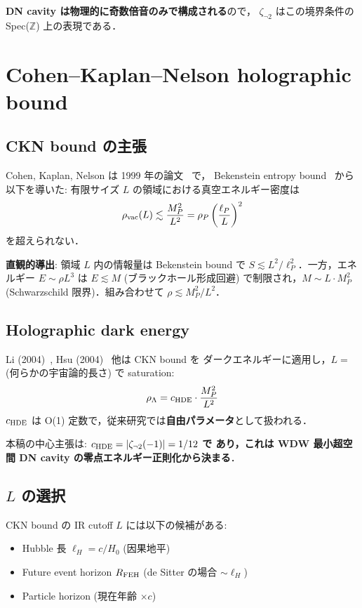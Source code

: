 \documentclass[11pt,a4paper]{article}
\begin{document}
\textbf{DN cavity は物理的に奇数倍音のみで構成される}ので，
$\zeta_{\neg 2}$ はこの境界条件の Spec($\mathbb{Z}$) 上の表現である．

\section{Cohen--Kaplan--Nelson holographic bound}

\subsection{CKN bound の主張}

Cohen, Kaplan, Nelson は 1999 年の論文~\cite{CKN1999} で，
Bekenstein entropy bound~\cite{Bekenstein1973} から以下を導いた:
有限サイズ $L$ の領域における真空エネルギー密度は
\begin{equation}
\rho_{\rm vac}(L) \lesssim \frac{M_P^2}{L^2} = \rho_P\left(\frac{\ell_P}{L}\right)^2
\end{equation}
を超えられない．

\textbf{直観的導出}: 領域 $L$ 内の情報量は Bekenstein bound で
$S \lesssim L^2/\ell_P^2$．一方，エネルギー $E \sim \rho L^3$ は
$E \lesssim M$ (ブラックホール形成回避) で制限され，$M \sim L \cdot M_P^2$
(Schwarzschild 限界)．組み合わせて $\rho \lesssim M_P^2/L^2$．

\subsection{Holographic dark energy}

Li (2004)~\cite{Li2004}, Hsu (2004)~\cite{Hsu2004} 他は CKN bound を
ダークエネルギーに適用し，$L = $ (何らかの宇宙論的長さ) で saturation:
\begin{equation}
\rho_\Lambda = c_{\rm HDE}\cdot\frac{M_P^2}{L^2}
\end{equation}
$c_{\rm HDE}$ は O(1) 定数で，従来研究では\textbf{自由パラメータ}として扱われる．

本稿の中心主張は: \textbf{$c_{\rm HDE} = |\zeta_{\neg 2}(-1)| = 1/12$ で
あり，これは WDW 最小超空間 DN cavity の零点エネルギー正則化から決まる}．

\subsection{$L$ の選択}

CKN bound の IR cutoff $L$ には以下の候補がある:
\begin{itemize}
\item Hubble 長 $\ell_H = c/H_0$ (因果地平)
\item Future event horizon $R_{\rm FEH}$ (de Sitter の場合 $\sim \ell_H$)
\item Particle horizon (現在年齢 $\times c$)
\end{itemize}
\end{document}
